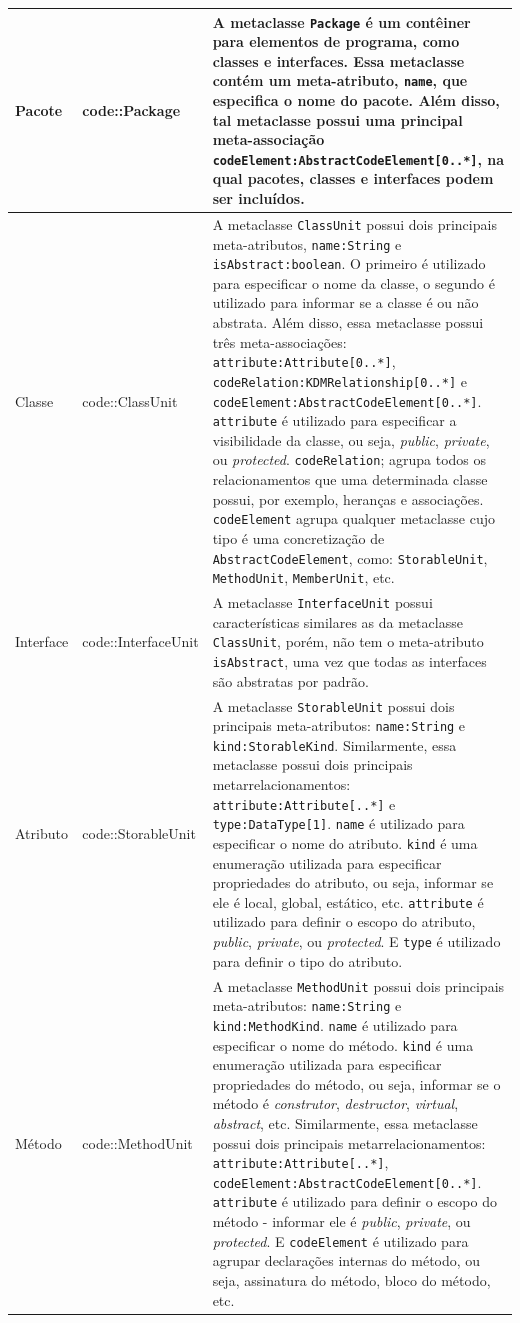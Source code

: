 \begin{longtable}[c]{| m{1.9cm} | m{3.57cm}| m{9.3cm} |}
 Pacote & code::Package & A metaclasse \texttt{Package} é um contêiner para elementos de programa, como classes e interfaces. Essa metaclasse contém um meta-atributo, \texttt{name}, que especifica o nome do pacote. Além disso, tal metaclasse possui uma principal meta-associação \texttt{codeElement:AbstractCodeElement[0..*]}, na qual pacotes, classes e interfaces podem ser incluídos. \\ 
\hline
Classe & code::ClassUnit & A metaclasse \texttt{ClassUnit} possui dois principais meta-atributos,  \texttt{name:String} e \texttt{isAbstract:boolean}. O primeiro é utilizado para especificar o nome da classe, o segundo é utilizado para informar se a classe é ou não abstrata. Além disso, essa metaclasse possui três meta-associações: \texttt{attribute:Attribute[0..*]}, \texttt{codeRelation:KDMRelationship[0..*]} e  \texttt{codeElement:AbstractCodeElement[0..*]}. \texttt{attribute} é utilizado para especificar a  visibilidade da classe, ou seja, \textit{public}, \textit{private}, ou \textit{protected}. \texttt{codeRelation}; agrupa todos os relacionamentos que uma determinada classe possui, por exemplo, heranças e associações. \texttt{codeElement} agrupa qualquer metaclasse cujo tipo é uma concretização de \texttt{AbstractCodeElement}, como: \texttt{StorableUnit}, \texttt{MethodUnit}, \texttt{MemberUnit}, etc. \\ 
\hline
Interface & code::InterfaceUnit & A metaclasse \texttt{InterfaceUnit} possui características similares as da metaclasse \texttt{ClassUnit}, porém, não tem o meta-atributo \texttt{isAbstract}, uma vez que todas as interfaces são abstratas por padrão. \\ 
\hline
Atributo & code::StorableUnit & A metaclasse \texttt{StorableUnit} possui dois principais meta-atributos: \texttt{name:String} e \texttt{kind:StorableKind}. Similarmente, essa metaclasse possui dois principais metarrelacionamentos: \texttt{attribute:Attribute[..*]} e \texttt{type:DataType[1]}. \texttt{name} é utilizado para especificar o nome do atributo. \texttt{kind} é uma enumeração utilizada para especificar propriedades do atributo, ou seja, informar se ele é local, global, estático, etc. \texttt{attribute} é utilizado para definir o escopo do atributo, \textit{public}, \textit{private}, ou \textit{protected}. E \texttt{type} é utilizado para definir o tipo do atributo.  \\ 
\hline
Método & code::MethodUnit & A metaclasse \texttt{MethodUnit} possui dois principais meta-atributos: \texttt{name:String} e \texttt{kind:MethodKind}. \texttt{name} é utilizado para especificar o nome do método. \texttt{kind} é uma enumeração utilizada para especificar propriedades do método, ou seja, informar se o método é \textit{construtor}, \textit{destructor}, \textit{virtual}, \textit{abstract}, etc. Similarmente, essa metaclasse possui dois principais metarrelacionamentos: \texttt{attribute:Attribute[..*]}, \texttt{codeElement:AbstractCodeElement[0..*]}. \texttt{attribute} é utilizado para definir o escopo do método - informar ele é \textit{public}, \textit{private}, ou \textit{protected}. E \texttt{codeElement} é utilizado para agrupar declarações internas do método, ou seja, assinatura do método, bloco do método, etc.\\ 

\end{longtable}
